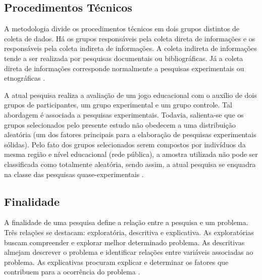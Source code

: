 \subsection{Procedimentos Técnicos}\label{sub:Procedimentos}

A metodologia divide os procedimentos técnicos em dois grupos distintos de coleta de dados. Há os grupos responsáveis pela coleta direta de informações e os responsáveis pela coleta indireta de informações. A coleta indireta de informações tende a ser realizada por pesquisas documentais ou bibliográficas. Já a coleta direta de informações corresponde normalmente a pesquisas experimentais ou etnográficas \cite{cordova2009pesquisa}. 

A atual pesquisa realiza a avaliação de um jogo educacional com o auxílio de dois grupos de participantes, um grupo experimental e um grupo controle. Tal abordagem é associada a pesquisas experimentais. Todavia, salienta-se que os grupos selecionados pelo presente estudo não obedecem a uma distribuição aleatória (um dos fatores principais para a elaboração de pesquisas experimentais sólidas). %
Pelo fato dos grupos selecionados serem compostos por indivíduos da mesma região e nível educacional (rede pública), a amostra utilizada não pode ser classificada como totalmente aleatória, sendo assim, a atual pesquisa se enquadra na classe das pesquisas quase-experimentais .


\subsection{Finalidade}\label{sub:Finalidade}

A finalidade de uma pesquisa define a relação entre a pesquisa e um problema. Três relações se destacam: exploratória, descritiva e explicativa. As exploratórias buscam compreender e explorar melhor determinado problema. As descritivas almejam descrever o problema e identificar relações entre variáveis associadas ao problema. As explicativas procuram explicar e determinar os fatores que contribuem para a ocorrência do problema \cite{trivinos2009introduccao}. 

